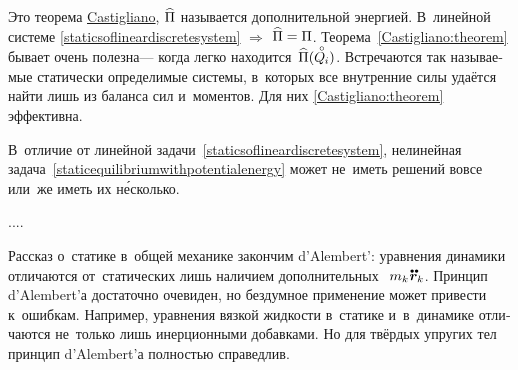 \begin{otherlanguage}{russian}
\vspace{-0.1em}\noindent
Это теорема \href{https://en.wikipedia.org/wiki/Carlo_Alberto_Castigliano}{Castigliano}, $\widehat{\Pi}$ называется дополнительной энергией.
В~линейной системе \eqref{staticsoflineardiscretesystem} ${\Rightarrow}$ ${\widehat{\Pi} = \Pi}$.
Теорема~\eqref{Castigliano:theorem} бывает очень полезна\:--- когда легко находится~${\widehat{\potential}(\mathcircabove{Q}_{\hspace{-0.1ex}i})}$.
Встречаются так называемые статически определимые системы, в~которых все внутренние силы удаётся найти лишь из баланса сил и~моментов.
Для них \eqref{Castigliano:theorem} эффективна.

В~отличие от линейной задачи~\eqref{staticsoflineardiscretesystem}, нелинейная задача~\eqref{staticequilibriumwithpotentialenergy} может не~иметь решений вовсе или~же иметь их н\'{е}сколько.

....

Рассказ о~статике в~общей механике закончим  \hbox{d’\hspace{-0.2ex}Alembert’}:
уравнения динамики отличаются от~статических лишь наличием дополнительных ~${\hspace{-0.2ex}m_k \hspace{.1ex} \mathdotdotabove{\locationvector}_k}$.
Принцип \hbox{d’\hspace{-0.2ex}Alembert’а} достаточно очевиден, но бездумное применение может привести к~ошибкам.
Например, уравнения вязкой жидкости в~статике и~в~динамике отличаются не~только лишь инерционными добавками.
Но для твёрдых упругих тел принцип \hbox{d’\hspace{-0.2ex}Alembert’а} полностью справедлив.

\end{otherlanguage}



\label{para:mechanicsofrelativemotion}

